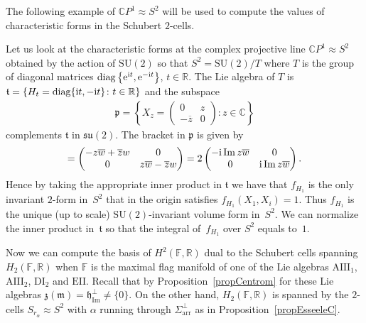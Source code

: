 \documentclass[10pt,a4paper]{amsart}
\numberwithin{equation}{section}
\newcommand{\func}[1]{\operatorname{#1}}
\begin{document}
The following example of $\mathbb{C}P^{1}\approx S^{2}$ will be used to compute the values of characteristic forms in the Schubert $2$-cells.

\begin{Example} Let us look at the characteristic forms at the complex projective line $\mathbb{C}P^{1}\approx S^{2}$ obtained by the action of $\mathrm{SU}(2) $ so that $S^{2}=\mathrm{SU}(2) /T$ where $T$ is the group of diagonal matrices $\operatorname{diag}\big\{{\rm e}^{{\rm i}t},{\rm e}^{-{\rm i}t}\big\}$, $t\in \mathbb{R}$. The Lie algebra of $T$ is $\mathfrak{t}=\{H_{t}=\operatorname{diag}\{{\rm i}t,-{\rm i}t\}\colon t\in \mathbb{R}\}$ and the subspace
\begin{gather*}
\mathfrak{p}=\left\{X_{z}=\left(
\begin{matrix}
0 & z \\
-\overline{z} & 0
\end{matrix}%
\right) \colon z\in \mathbb{C}\right\}
\end{gather*}%
complements $\mathfrak{t}$ in $\mathfrak{su}(2) $. The bracket in $\mathfrak{p}$ is given by
\begin{gather*}
[ X_{z},X_{w}] =\left(
\begin{matrix}
-z\overline{w}+\overline{z}w & 0 \\
0 & z\overline{w}-\overline{z}w
\end{matrix}%
\right) =2\left(
\begin{matrix}
-{\rm i}\func{Im}z\overline{w} & 0 \\
0 & {\rm i}\func{Im}z\overline{w}
\end{matrix}
\right).
\end{gather*}
Hence by taking the appropriate inner product in $\mathfrak{t}$ we have that $f_{H_{1}}$ is the only invariant $2$-form in~$S^{2}$ that in the origin satisfies $f_{H_{1}} ( X_{1},X_{i} ) =1$. Thus $f_{H_{1}}$ is the unique (up to scale) $\mathrm{SU}(2) $-invariant volume form in~$S^{2}$. We can normalize the inner product in~$\mathfrak{t}$ so that the integral of~$f_{H_{1}}$ over $S^{2}$ equals to~$1$.
\end{Example}

Now we can compute the basis of $H^{2}( \mathbb{F},\mathbb{R}) $ dual to the Schubert cells spanning $H_{2} ( \mathbb{F},\mathbb{R} ) $ when $\mathbb{F}$ is the maximal flag manifold of one of the Lie algebras $\mathrm{AIII}_{1}$, $\mathrm{AIII}_{2}$, $\mathrm{DI}_{2}$ and $\mathrm{EII}$. Recall that by Proposition~\ref{propCentrom} for these Lie algebras $\mathfrak{z}(\mathfrak{m}) =\mathfrak{h}_{\func{Im}}^{\bot }\neq \{0\}$. On the other hand, $H_{2} ( \mathbb{F},\mathbb{R} ) $ is spanned by the $2$-cells $S_{r_{\alpha }}\approx S^{2}$ with $\alpha $ running through $\Sigma _{\mathrm{arr}}^{\bot }$ as in Proposition~\ref{propEsseeleC}.
\end{document}
